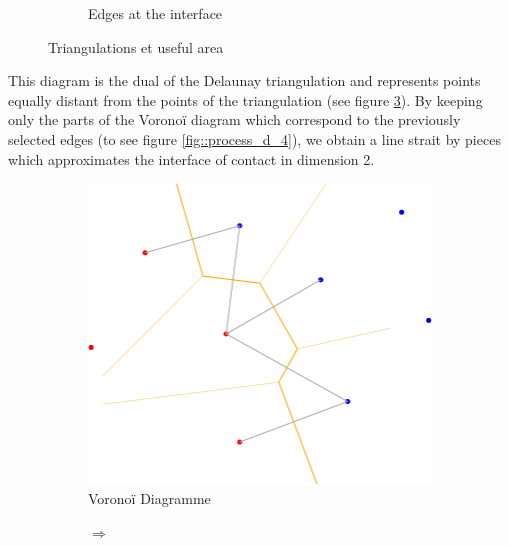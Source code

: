 \begin{figure}[ht]
\begin{subfigure}{0.45\textwidth}
  \caption{Edges at the interface}
  \label{fig::process_d_2}
\end{subfigure}
\caption{Triangulations et useful area}
\label{fig::delaunays_process_1}
\end{figure}


This diagram is the dual of the Delaunay triangulation and represents points
equally distant from the points of the triangulation (see figure \ref{fig::process_d_3}).
By keeping only the parts of the Voronoï diagram which correspond
 to the previously selected edges (to see figure \ref{fig::process_d_4}),
  we obtain a line strait by pieces which approximates the interface of contact in dimension 2.

\begin{figure}[ht]
\centering
\begin{subfigure}{0.45\textwidth}
  \centering
  \includegraphics[width=\textwidth]{figures/process_d_3.png}
  \caption{Voronoï Diagramme}
  \label{fig::process_d_3}
\end{subfigure}%
\begin{subfigure}{0.1\textwidth}
  \centering
  $\Longrightarrow$
\end{subfigure}%
\begin{subfigure}{0.45\textwidth}
  \centering

\end{subfigure}
\end{figure}
